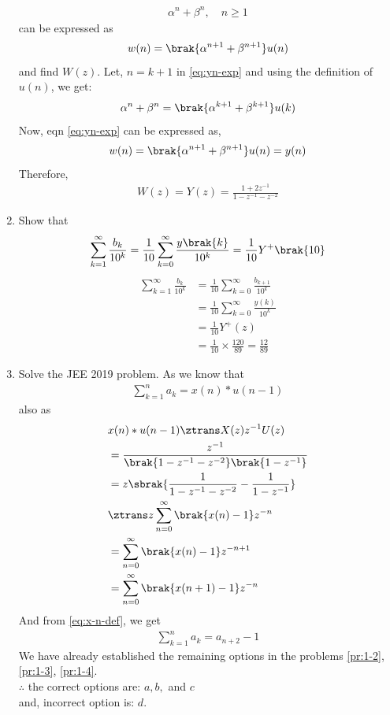 \documentclass[journal,12pt,twocolumn]{IEEEtran}
\renewcommand\thesection{\arabic{section}}
\begin{document}
\begin{enumerate}[label=\thesection.\arabic*,ref=\thesection.\theenumi]
\begin{align}
	\alpha^n + \beta^n, \quad n \ge 1
	\label{eq:yn-exp}
\end{align}
can be expressed as 
\begin{align}
	w(n) =\brak{\alpha^{n+1} + \beta^{n+1}}u(n)
\end{align}
and find $W(z)$.
\solution Let, $n = k + 1$ in \eqref{eq:yn-exp} and using the definition of $u(n)$, we get: 
\begin{align}
	\alpha^n + \beta^n = \brak{\alpha^{k + 1} + \beta^{k + 1}}u(k)
\end{align}
Now, eqn \eqref{eq:yn-exp} can be expressed as,
\begin{align}
	w(n) = \brak{\alpha^{n+1} + \beta^{n+1}}u(n) = y(n)
\end{align}
Therefore,
\begin{align}
	W(z) = Y(z) = \frac{1 + 2z^{-1}}{1 - z^{-1} - z^{-2}}
\end{align}

\item Show that 
\begin{align}
	\sum_{k=1}^{\infty}\frac{b_k}{10^k} =
	\frac{1}{10}\sum_{k=0}^{\infty}\frac{y\brak{k}}{10^k} =\frac{1}{10}Y^{+}\brak{{10}}
\end{align}
\label{pr:1-4}
\solution
\begin{align}
	\sum_{k=1}^{\infty}\frac{b_k}{10^k} &= \frac{1}{10}\sum_{k = 0}^{\infty}\frac{b_{k+1}}{10^k} \\
	&= \frac{1}{10}\sum_{k = 0}^{\infty}\frac{y(k)}{10^k} \\
	&= \frac{1}{10}Y^+(z) \\
	&= \frac{1}{10}\times\frac{120}{89} = \frac{12}{89}
\end{align}
\break
\item Solve the JEE 2019 problem.
\label{pr:1-6}
\solution As we know that
\begin{align}
	\sum_{k = 1}^{n}a_k = x(n)*u(n - 1)
\end{align}
also as
\begin{align}
	&x(n)*u(n - 1) \ztrans X(z)z^{-1}U(z) \\
	&= \frac{z^{-1}}{\brak{1 - z^{-1} - z^{-2}}\brak{1 - z^{-1}}} \\
	&= z\sbrak{\frac{1}{1 - z^{-1} - z^{-2}} - \frac{1}{1 - z^{-1}}} \\
	&\ztrans z\sum_{n = 0}^{\infty}\brak{x(n) - 1}z^{-n} \\
	&= \sum_{n = 0}^{\infty}\brak{x(n) - 1}z^{-n + 1} \\
	&= \sum_{n = 0}^{\infty}\brak{x(n + 1) - 1}z^{-n} 
\end{align}
And from \eqref{eq:x-n-def}, we get
\begin{align}
	\sum_{k = 1}^{n}a_k = a_{n+2} - 1
\end{align}
We have already established the remaining options in the problems
\eqref{pr:1-2}, \eqref{pr:1-3}, \eqref{pr:1-4}. \\
$\therefore$ the correct options are: $a, b,$ and $c$\\
and, incorrect option is: $d$.
\end{enumerate}
\end{document}
